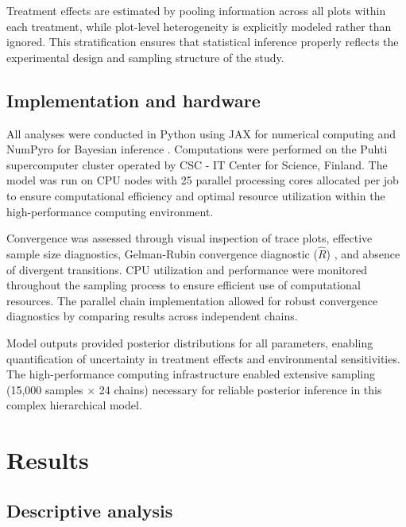 \documentclass[12pt,a4paper]{article}
\begin{document}
Treatment effects are estimated by pooling information across all plots within each treatment, while plot-level heterogeneity is explicitly modeled rather than ignored. This stratification ensures that statistical inference properly reflects the experimental design and sampling structure of the study.


\subsection{Implementation and hardware}

All analyses were conducted in Python using JAX for numerical computing and NumPyro for Bayesian inference \citep{phan2019composable}. Computations were performed on the Puhti supercomputer cluster operated by CSC - IT Center for Science, Finland. The model was run on CPU nodes with 25 parallel processing cores allocated per job to ensure computational efficiency and optimal resource utilization within the high-performance computing environment.

Convergence was assessed through visual inspection of trace plots, effective sample size diagnostics, Gelman-Rubin convergence diagnostic ($\hat{R}$) \citep{gelman1992inference, vehtari2021rank}, and absence of divergent transitions. CPU utilization and performance were monitored throughout the sampling process to ensure efficient use of computational resources. The parallel chain implementation allowed for robust convergence diagnostics by comparing results across independent chains.

Model outputs provided posterior distributions for all parameters, enabling quantification of uncertainty in treatment effects and environmental sensitivities. The high-performance computing infrastructure enabled extensive sampling (15,000 samples $\times$ 24 chains) necessary for reliable posterior inference in this complex hierarchical model.


\section{Results}

\subsection{Descriptive analysis}
\end{document}
